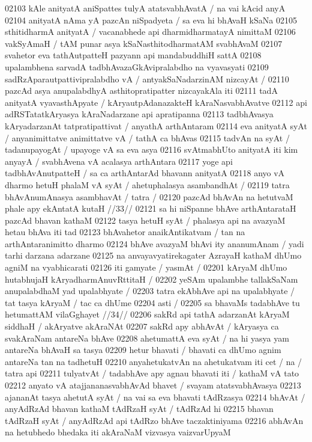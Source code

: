 02103 kAle anityatA aniSpattes tulyA atatsvabhAvatA / na vai kAcid anyA 
02104 anityatA nAma yA pazcAn niSpadyeta / sa eva hi bhAvaH kSaNa
02105 sthitidharmA anityatA / vacanabhede api dharmidharmatayA nimittaM
02106 vakSyAmaH / tAM punar asya kSaNasthitodharmatAM  svabhAvaM 
02107 svahetor eva tathAutpatteH pazyann api mandabuddhiH sattA  
02108 upalambhena sarvadA tadbhAvazaGkAvipralabdho na vyavasyati  
02109 sadRzAparautpattivipralabdho vA / antyakSaNadarzinAM nizcayAt /  
02110 pazcAd asya anupalabdhyA asthitopratipatter nizcayakAla iti 
02111 tadA anityatA vyavasthApyate / kAryautpAdanazakteH  kAraNasvabhAvatve
02112 api adRSTatatkAryasya kAraNadarzane api apratipanna  
02113 tadbhAvasya kAryadarzanAt tatpratipattivat / anyathA  arthAntaram
02114 eva anityatA syAt / anyanimittatve animittatve vA / tathA ca bhAvas 
02115 tadvAn na syAt / tadanupayogAt / upayoge vA sa eva asya  
02116 svAtmabhUto anityatA iti kim anyayA / svabhAvena vA acalasya arthAntara
02117 yoge api tadbhAvAnutpatteH / sa ca arthAntarAd bhavann anityatA
02118 anyo vA dharmo hetuH phalaM vA syAt / ahetuphalasya asambandhAt / 
02119 tatra bhAvAnumAnasya asambhavAt / tatra / 
02120 	pazcAd bhAvAn na hetutvaM phale apy ekAntatA kutaH //33// 
02121 sa hi niSpanne bhAve arthAntarataH pazcAd bhavan kathaM
02122 tasya hetuH syAt / phalasya api na avazyaM hetau bhAva iti tad
02123 bhAvahetor anaikAntikatvam / tan na arthAntaranimitto dharmo  
02124 bhAve avazyaM bhAvi ity ananumAnam / yadi tarhi darzana adarzane
02125 na anvayavyatirekagater AzrayaH kathaM dhUmo agniM na  vyabhicarati
02126 iti gamyate / yasmAt /
02201 kAryaM dhUmo hutabhujaH kAryadharmAnuvRttitaH /
02202 yeSAm upalambhe tallakSaNam anupalabdhaM yad upalabhyate /  
02203 tatra ekAbhAve api na upalabhyate / tat tasya kAryaM / tac ca  dhUme 
02204 asti /  
02205 	sa bhavaMs tadabhAve tu hetumattAM vilaGghayet //34// 
02206 sakRd api tathA adarzanAt kAryaM siddhaH / akAryatve akAraNAt 
02207 sakRd apy abhAvAt / kAryasya ca svakAraNam antareNa bhAve  
02208 ahetumattA eva syAt / na hi yasya yam antareNa bhAvaH sa tasya
02209 hetur bhavati / bhavati ca dhUmo agnim antareNa tan na tadhetuH
02210 anyahetukatvAn na ahetukatvam iti cet / na / tatra api
02211 tulyatvAt / tadabhAve apy agnau bhavati iti / kathaM vA tato 
02212 anyato vA atajjananasvabhAvAd bhavet / svayam atatsvabhAvasya
02213 ajananAt tasya ahetutA syAt / na vai sa eva bhavati tAdRzasya
02214 bhAvAt / anyAdRzAd bhavan kathaM tAdRzaH syAt / tAdRzAd hi 
02215 bhavan tAdRzaH syAt / anyAdRzAd api tAdRzo bhAve taczaktiniyama 
02216 abhAvAn na hetubhedo bhedaka iti akAraNaM vizvasya vaizvarUpyaM
